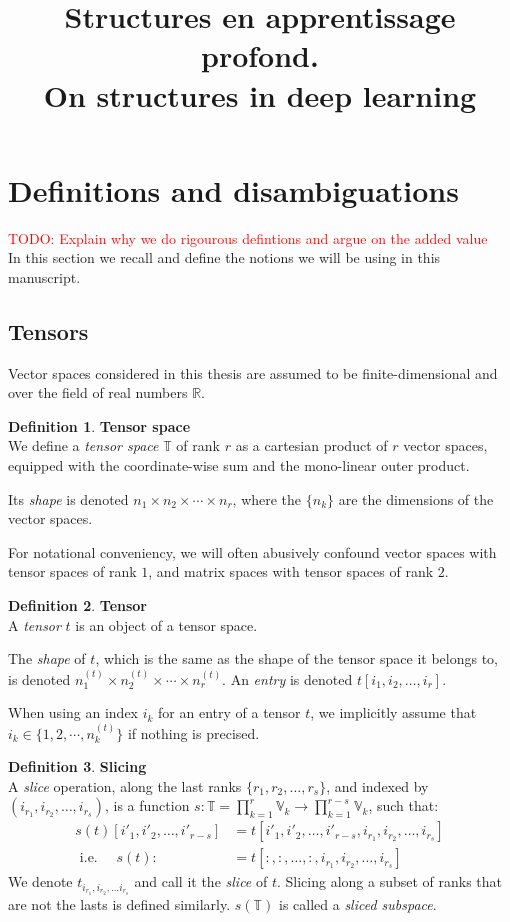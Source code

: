 \documentclass{article}
\title{Structures en apprentissage profond.\\ On structures in deep learning}
\theoremstyle{definition}
\newtheorem{definition}{Definition}[section]
\newcommand{\real}{\mathbb{R}}
\newcommand{\tspace}{\mathbb{T}}
\newcommand{\vecspace}{\mathbb{V}}
\newcommand{\todo}[1]{\textcolor{red}{TODO: #1\\}}
\begin{document}
\section{Definitions and disambiguations}

\todo{Explain why we do rigourous defintions and argue on the added value}
In this section we recall and define the notions we will be using in this manuscript.

\subsection{Tensors}

Vector spaces considered in this thesis are assumed to be finite-dimensional and over the field of real numbers $\real$.

\begin{definition}\textbf{Tensor space}\\
We define a \emph{tensor space} $\tspace$ of rank $r$ as a cartesian product of $r$ vector spaces, equipped with the coordinate-wise sum and the mono-linear outer product.

Its \emph{shape} is denoted $n_1 \times n_2 \times \cdots \times n_r$, where the $\{n_k\}$ are the dimensions of the vector spaces.
\end{definition}

For notational conveniency, we will often abusively confound vector spaces with tensor spaces of rank $1$, and matrix spaces with tensor spaces of rank $2$.

\begin{definition}\textbf{Tensor}\\
A \emph{tensor} $t$ is an object of a tensor space.

The \emph{shape} of $t$, which is the same as the shape of the tensor space it belongs to, is denoted $n_1^{(t)} \times n_2^{(t)} \times \cdots \times n_r^{(t)}$.
An \emph{entry} is denoted $t[i_1, i_2, \ldots, i_r]$.
\end{definition}

When using an index $i_k$ for an entry of a tensor $t$, we implicitly assume that $i_k \in \{1, 2, \cdots, n_k^{(t)}\}$ if nothing is precised.

\begin{definition}\textbf{Slicing}\\
A \emph{slice} operation, along the last ranks $\{r_1, r_2, \ldots, r_s\}$, and indexed by $(i_{r_1}, i_{r_2}, \ldots, i_{r_s})$, is a function $s: \tspace = \displaystyle \prod_{k=1}^r \vecspace_k \rightarrow \prod_{k=1}^{r-s} \vecspace_k$, such that:
\begin{align*}
s(t)[i'_1, i'_2, \ldots, i'_{r-s}] &= t[i'_1, i'_2, \ldots, i'_{r-s}, i_{r_1}, i_{r_2}, \ldots, i_{r_s}] \\
\text{ i.e. } \quad s(t) :&= t[:,:, \ldots, :, i_{r_1}, i_{r_2}, \ldots, i_{r_s}]
\end{align*}
We denote $t_{i_{r_1}, i_{r_2}, \ldots i_{r_s}}$ and call it the \emph{slice} of $t$. 
Slicing along a subset of ranks that are not the lasts is defined similarly.
$s(\tspace)$ is called a \emph{sliced subspace}.
\end{definition}
\end{document}
